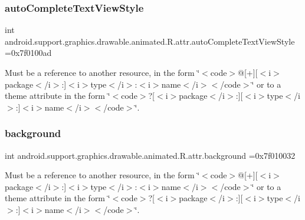 \subsubsection{\texorpdfstring{auto\+Complete\+Text\+View\+Style}{autoCompleteTextViewStyle}}
{\footnotesize\ttfamily int android.\+support.\+graphics.\+drawable.\+animated.\+R.\+attr.\+auto\+Complete\+Text\+View\+Style =0x7f0100ad\hspace{0.3cm}{\ttfamily [static]}}

Must be a reference to another resource, in the form \char`\"{}$<$code$>$@\mbox{[}+\mbox{]}\mbox{[}$<$i$>$package$<$/i$>$\+:\mbox{]}$<$i$>$type$<$/i$>$\+:$<$i$>$name$<$/i$>$$<$/code$>$\char`\"{} or to a theme attribute in the form \char`\"{}$<$code$>$?\mbox{[}$<$i$>$package$<$/i$>$\+:\mbox{]}\mbox{[}$<$i$>$type$<$/i$>$\+:\mbox{]}$<$i$>$name$<$/i$>$$<$/code$>$\char`\"{}. \mbox{\label{classandroid_1_1support_1_1graphics_1_1drawable_1_1animated_1_1R_1_1attr_aa687cb35795fc4b34f22c9273267b25b}} 
\subsubsection{\texorpdfstring{background}{background}}
{\footnotesize\ttfamily int android.\+support.\+graphics.\+drawable.\+animated.\+R.\+attr.\+background =0x7f010032\hspace{0.3cm}{\ttfamily [static]}}

Must be a reference to another resource, in the form \char`\"{}$<$code$>$@\mbox{[}+\mbox{]}\mbox{[}$<$i$>$package$<$/i$>$\+:\mbox{]}$<$i$>$type$<$/i$>$\+:$<$i$>$name$<$/i$>$$<$/code$>$\char`\"{} or to a theme attribute in the form \char`\"{}$<$code$>$?\mbox{[}$<$i$>$package$<$/i$>$\+:\mbox{]}\mbox{[}$<$i$>$type$<$/i$>$\+:\mbox{]}$<$i$>$name$<$/i$>$$<$/code$>$\char`\"{}. \mbox{\label{classandroid_1_1support_1_1graphics_1_1drawable_1_1animated_1_1R_1_1attr_a784c5646f1e48c04c03f8dcff36e01d7}} 
